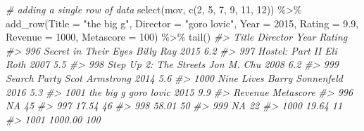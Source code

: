 \documentclass[
]{book}
\newenvironment{Shaded}{\begin{snugshade}}{\end{snugshade}}
\newcommand{\AttributeTok}[1]{\textcolor[rgb]{0.77,0.63,0.00}{#1}}
\newcommand{\CommentTok}[1]{\textcolor[rgb]{0.56,0.35,0.01}{\textit{#1}}}
\newcommand{\DecValTok}[1]{\textcolor[rgb]{0.00,0.00,0.81}{#1}}
\newcommand{\FloatTok}[1]{\textcolor[rgb]{0.00,0.00,0.81}{#1}}
\newcommand{\FunctionTok}[1]{\textcolor[rgb]{0.00,0.00,0.00}{#1}}
\newcommand{\NormalTok}[1]{#1}
\newcommand{\SpecialCharTok}[1]{\textcolor[rgb]{0.00,0.00,0.00}{#1}}
\newcommand{\StringTok}[1]{\textcolor[rgb]{0.31,0.60,0.02}{#1}}
\begin{document}
\begin{Shaded}
\begin{Highlighting}[]
\CommentTok{\# adding a single row of data}
\FunctionTok{select}\NormalTok{(mov, }\FunctionTok{c}\NormalTok{(}\DecValTok{2}\NormalTok{, }\DecValTok{5}\NormalTok{, }\DecValTok{7}\NormalTok{, }\DecValTok{9}\NormalTok{, }\DecValTok{11}\NormalTok{, }\DecValTok{12}\NormalTok{)) }\SpecialCharTok{\%\textgreater{}\%}
\FunctionTok{add\_row}\NormalTok{(}\AttributeTok{Title =} \StringTok{"the big g"}\NormalTok{, }
        \AttributeTok{Director =} \StringTok{"goro lovic"}\NormalTok{, }
        \AttributeTok{Year =} \DecValTok{2015}\NormalTok{, }
        \AttributeTok{Rating =} \FloatTok{9.9}\NormalTok{, }
        \AttributeTok{Revenue =} \DecValTok{1000}\NormalTok{, }
        \AttributeTok{Metascore =} \DecValTok{100}\NormalTok{) }\SpecialCharTok{\%\textgreater{}\%}
\FunctionTok{tail}\NormalTok{()}
\CommentTok{\#\textgreater{}                       Title         Director Year Rating}
\CommentTok{\#\textgreater{} 996    Secret in Their Eyes        Billy Ray 2015    6.2}
\CommentTok{\#\textgreater{} 997         Hostel: Part II         Eli Roth 2007    5.5}
\CommentTok{\#\textgreater{} 998  Step Up 2: The Streets       Jon M. Chu 2008    6.2}
\CommentTok{\#\textgreater{} 999            Search Party   Scot Armstrong 2014    5.6}
\CommentTok{\#\textgreater{} 1000             Nine Lives Barry Sonnenfeld 2016    5.3}
\CommentTok{\#\textgreater{} 1001              the big g       goro lovic 2015    9.9}
\CommentTok{\#\textgreater{}      Revenue Metascore}
\CommentTok{\#\textgreater{} 996       NA        45}
\CommentTok{\#\textgreater{} 997    17.54        46}
\CommentTok{\#\textgreater{} 998    58.01        50}
\CommentTok{\#\textgreater{} 999       NA        22}
\CommentTok{\#\textgreater{} 1000   19.64        11}
\CommentTok{\#\textgreater{} 1001 1000.00       100}


\end{Highlighting}
\end{Shaded}
\end{document}
